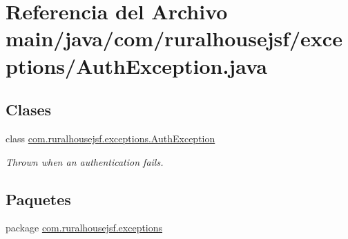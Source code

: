 \hypertarget{a00059}{}\section{Referencia del Archivo main/java/com/ruralhousejsf/exceptions/\+Auth\+Exception.java}
\label{a00059}
\subsection*{Clases}
\begin{DoxyCompactItemize}
\item 
class \mbox{\hyperlink{a00204}{com.\+ruralhousejsf.\+exceptions.\+Auth\+Exception}}
\begin{DoxyCompactList}\small\item\em Thrown when an authentication fails. \end{DoxyCompactList}\end{DoxyCompactItemize}
\subsection*{Paquetes}
\begin{DoxyCompactItemize}
\item 
package \mbox{\hyperlink{a00118}{com.\+ruralhousejsf.\+exceptions}}
\end{DoxyCompactItemize}
